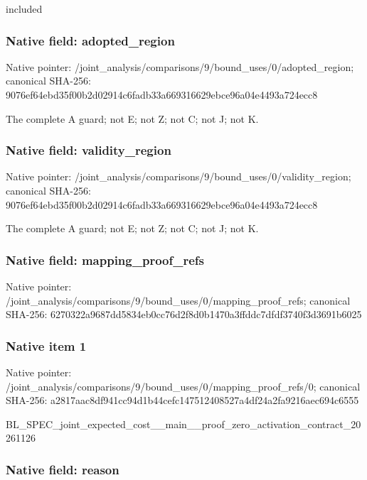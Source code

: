 \documentclass[10pt,a4paper]{article}
\begin{document}
included


\subsubsection{Native field: adopted\_region}


Native pointer: /joint\_analysis/comparis\allowbreak{}ons/9/bound\_uses/0/adopt\allowbreak{}ed\_region; canonical SHA-256: 9076ef64ebd35f00b2d02914\allowbreak{}c6fadb33a669316629ebce96\allowbreak{}a04e4493a724ecc8


The complete A guard; not E; not Z; not C; not J; not K.


\subsubsection{Native field: validity\_region}


Native pointer: /joint\_analysis/comparis\allowbreak{}ons/9/bound\_uses/0/valid\allowbreak{}ity\_region; canonical SHA-256: 9076ef64ebd35f00b2d02914\allowbreak{}c6fadb33a669316629ebce96\allowbreak{}a04e4493a724ecc8


The complete A guard; not E; not Z; not C; not J; not K.


\subsubsection{Native field: mapping\_proof\_refs}


Native pointer: /joint\_analysis/comparis\allowbreak{}ons/9/bound\_uses/0/mappi\allowbreak{}ng\_proof\_refs; canonical SHA-256: 6270322a9687dd5834eb0cc7\allowbreak{}6d2f8d0b1470a3ffddc7dfdf\allowbreak{}3740f3d3691b6025



\subsubsection{Native item 1}


Native pointer: /joint\_analysis/comparis\allowbreak{}ons/9/bound\_uses/0/mappi\allowbreak{}ng\_proof\_refs/0; canonical SHA-256: a2817aac8df941cc94d1b44c\allowbreak{}efc147512408527a4df24a2f\allowbreak{}a9216aec694c6555


BL\_SPEC\_joint\_expected\_c\allowbreak{}ost\_\_main\_\_proof\_zero\_ac\allowbreak{}tivation\_contract\_202611\allowbreak{}26


\subsubsection{Native field: reason}
\end{document}
